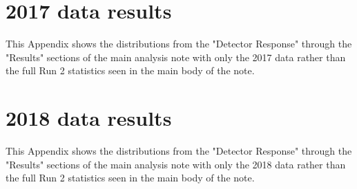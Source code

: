 \section{2017 data results}

This Appendix shows the distributions from the "Detector Response" through the "Results" sections of the main analysis note with only the 2017 data rather than the full Run 2 statistics seen in the main body of the note.









%


%





















\section{2018 data results}

This Appendix shows the distributions from the "Detector Response" through the "Results" sections of the main analysis note with only the 2018 data rather than the full Run 2 statistics seen in the main body of the note.









%


%





















